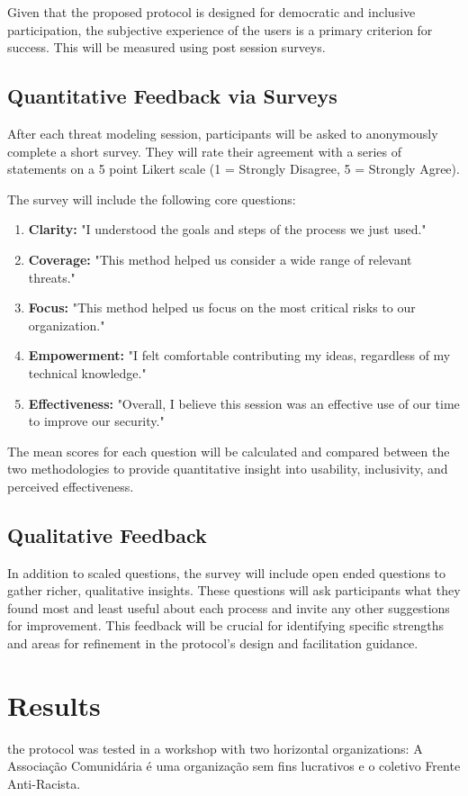 Given that the proposed protocol is designed 
for democratic and inclusive
participation, the subjective experience of the users is a primary criterion for
success. This will be measured using post session surveys.

\subsection{Quantitative Feedback via Surveys}
\label{subsec:quantitative_feedback}

After each threat modeling session, participants will be asked to anonymously
complete a short survey. They will rate their agreement with a series of
statements on a 5 point Likert scale (1 = Strongly Disagree, 5 = Strongly
Agree).

The survey will include the following core questions:

\begin{enumerate}
\item \textbf{Clarity:} "I understood the goals and steps of the process we just used."
\item \textbf{Coverage:} "This method helped us consider a wide range of relevant threats."
\item \textbf{Focus:} "This method helped us focus on the most critical risks to our organization."
\item \textbf{Empowerment:} "I felt comfortable contributing my ideas, regardless of my technical knowledge."
\item \textbf{Effectiveness:} "Overall, I believe this session was an effective use of our time to improve our security."
\end{enumerate}

The mean scores for each question will be calculated and compared between the
two methodologies to provide quantitative insight into usability, inclusivity,
and perceived effectiveness.

\subsection{Qualitative Feedback}
\label{subsec:qualitative_feedback}

In addition to scaled questions, the survey will include open ended questions to
gather richer, qualitative insights. These questions will ask participants what
they found most and least useful about each process and invite any other
suggestions for improvement. This feedback will be crucial for identifying
specific strengths and areas for refinement in the protocol's design and
facilitation guidance.

\section{Results}
\label{sec:results}

the protocol was tested in a workshop with two horizontal organizations: 
A Associação Comunidária é uma organização sem fins lucrativos e 
o coletivo Frente Anti-Racista.

